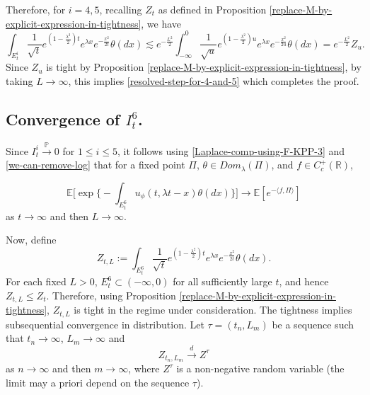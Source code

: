 \documentclass[a4paper,reqno]{amsart}%
\newcommand{\1}{\mathbf 1}
\theoremstyle{mine}
\numberwithin{theorem}{section}
\numberwithin{equation}{section}
\theoremstyle{remark}
\begin{document}
Therefore, for $i=4,5$, recalling $Z_t$ as defined in Proposition \ref{replace-M-by-explicit-expression-in-tightness}, we have  
\begin{equation}\label{compare for I_i}
    \int_{E_t^i}\frac{1}{\sqrt{t}}e^{(1-\frac{\lambda^2}{2})t}e^{\lambda x}e^{-\frac{x^2}{2t}}\theta(dx) \lesssim e^{-\frac{L^2}{2}} \int_{-\infty}^0 \frac{1}{\sqrt{u}}e^{(1-\frac{\lambda^2}{2})u}e^{\lambda x}e^{-\frac{x^2}{2u}} \theta(dx) = e^{-\frac{L^2}{2}} Z_u. 
\end{equation}
Since $Z_u$ is tight by Proposition \ref{replace-M-by-explicit-expression-in-tightness}, by taking $L\to \infty$, this implies \eqref{resolved-step-for-4-and-5} which completes the proof. 


\subsection{Convergence of $I_t^6$.}


Since $I_t^i \overset{\mathbb{P}}{\to} 0$ for $1\leq i\leq 5$, it follows using  \eqref{Laplace-comp-using-F-KPP-3} and \eqref{we-can-remove-log} that for a fixed point $\Pi$, $\theta \in Dom_{\lambda}(\Pi)$, and $f\in C_c^+(\mathbb{R})$, 

\begin{equation}\label{resolving-to-set-E-6}
\mathbb{E}\biggl[\exp\biggl\{-\int_{E_t^6} u_\phi(t, \lambda t -x)\theta(dx)\biggr\}\biggr] \to \mathbb{E}[e^{-\langle f,\Pi\rangle}]
\end{equation}
as $t\to \infty$ and then $L\to \infty$. 

Now, define 
\begin{equation}\label{def-Z-t-L}
    Z_{t,L} := \int_{E_t^6} \frac{1}{\sqrt{t}}e^{(1-\frac{\lambda^2}{2})t}e^{\lambda x}e^{-\frac{x^2}{2t}} \theta(dx).
\end{equation}
For each fixed $L>0$, $E_t^6 \subset (-\infty,0)$ for all sufficiently large $t$, and hence $Z_{t,L} \le Z_{t}$. Therefore, using Proposition \ref{replace-M-by-explicit-expression-in-tightness}, $Z_{t,L}$ is tight in the regime under consideration. The tightness implies subsequential convergence in distribution. Let $\tau = (t_n, L_m)$ be a sequence such that $t_n \to \infty$, $L_m \to \infty$ and 
\begin{equation}\label{Z-tau-def}
    Z_{t_n,L_m} \overset{d}{\to} Z^{\tau}
\end{equation}
as $n\to \infty$ and then $m\to \infty$, where $Z^\tau$ is a non-negative random variable (the limit may a priori depend on the sequence $\tau$). 
\end{document}
